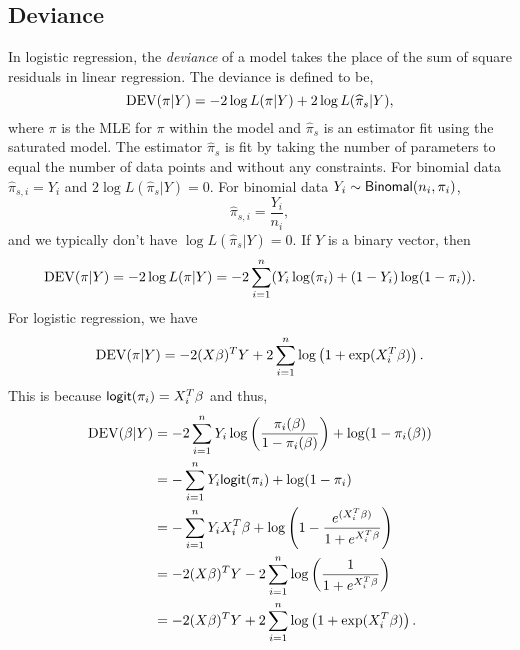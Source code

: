 \subsection{Deviance}
In  logistic regression, the \emph{deviance} of a model takes the place of the sum of square residuals in linear regression.  The  deviance is defined to be,
\[\operatorname{DEV}(\pi|Y) =  -2\log L(\pi|Y)+2\log L(\widehat{\pi}_s|Y), \]
where $\pi$ is the MLE for $\pi$ within the model  and $\widehat{\pi}_s$ is an  estimator fit using the saturated model. The estimator  $\widehat{\pi}_s$  is fit by taking the number of parameters to equal the number of data points and without  any constraints. For binomial data $\widehat{\pi}_{s,i} = Y_i$ and $2\log L(\widehat{\pi}_s|Y) = 0$. For binomial data $Y_i \sim \mathsf{Binomal}(n_i,\pi_i)$,
\[\widehat{\pi}_{s,i}=\frac{Y_i}{n_i},\]  
and we typically don't have $\log L(\widehat{\pi}_s|Y)=0$. If $Y$ is a binary vector, then
\[\operatorname{DEV}(\pi|Y)= -2\log L(\pi|Y)= -2\sum_{i=1}^n(Y_i\log(\pi_i)+(1-Y_i)\log(1-\pi_i)).\]
For logistic regression, we have
\[\operatorname{DEV}(\pi|Y) = -2(X\beta)^TY+2\sum_{i=1}^n \log\left(1+\exp(X_i^T\beta)\right).\]
This is because $\mathsf{logit}(\pi_i)=X_i^T\beta$ and thus,
\begin{align*}
\operatorname{DEV}(\beta|Y) &=-2\sum_{i=1}^n Y_i\log\left(\frac{\pi_i(\beta)}{1-\pi_i(\beta)}\right)+\log(1-\pi_i(\beta))\\
&=-\sum_{i=1}^n Y_i \mathsf{logit}(\pi_i)+\log(1-\pi_i)\\
&=-\sum_{i=1}^n Y_i X_i^T\beta + \log\left(1-\frac{e^{(X_i^T\beta)}}{1+e^{X_i^T\beta}}\right)\\
&=-2(X\beta)^TY-2\sum_{i=1}^n \log\left(\frac{1}{1+e^{X_i^T\beta}}\right)\\
&=-2(X\beta)^TY+2\sum_{i=1}^n\log\left(1+\exp(X_i^T\beta)\right).
\end{align*}

